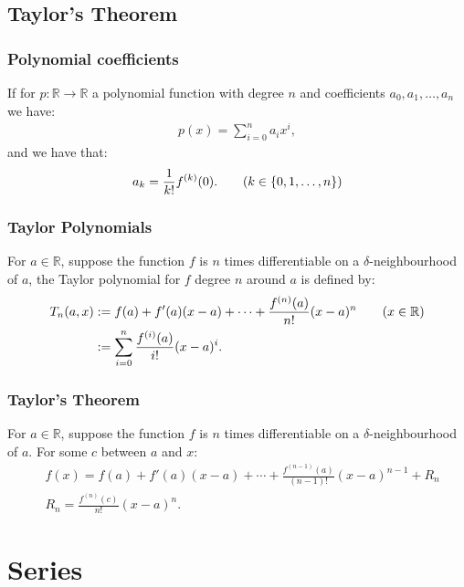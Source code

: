 \documentclass[a4paper, 12pt, twoside]{article}
\begin{document}
\subsection{Taylor's Theorem}

\subsubsection{Polynomial coefficients}

If for $p : \mathbb{R} \to \mathbb{R}$ a polynomial function with degree $n$
and coefficients $a_0, a_1, \ldots, a_n$ we have:
\begin{align*}
      p(x) = \sum_{i = 0}^n a_ix^i,
\end{align*}
and we have that:
\begin{align*}
      a_k = \frac{1}{k!}f^{(k)}(0). \tag{$k \in \{0, 1, \ldots, n\}$}
\end{align*}

\subsubsection{Taylor Polynomials}

For $a \in \mathbb{R}$, suppose the function $f$ is $n$ times differentiable
on a $\delta$-neighbourhood of $a$, the Taylor polynomial for $f$ degree $n$
around $a$ is defined by:
\begin{align*}
      T_n(a, x) & := f(a) + f'(a)(x - a) + \cdots
      + \frac{f^{(n)}(a)}{n!}(x - a)^n \tag{$x \in \mathbb{R}$}     \\
                & := \sum_{i = 0}^n \frac{f^{(i)}(a)}{i!}(x - a)^i.
\end{align*}

\subsubsection{Taylor's Theorem}

For $a \in \mathbb{R}$, suppose the function $f$ is $n$ times differentiable
on a $\delta$-neighbourhood of $a$. For some $c$ between $a$ and $x$:
\begin{align*}
       & f(x) = f(a) + f'(a)(x - a) + \cdots + \frac{f^{(n-1)}(a)}{(n - 1)!}(x-a)^{n-1}
      + R_n                                                                             \\
       & R_n = \frac{f^{(n)}(c)}{n!}(x - a)^n. \tag{Lagrange Form}
\end{align*}

\section{Series}
\end{document}
